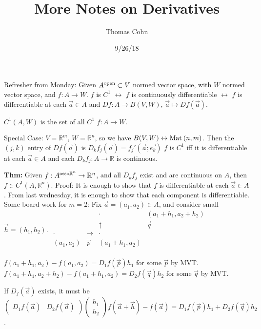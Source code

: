 \documentclass[10pt,letterpaper]{article}
\author{Thomas Cohn}
\title{More Notes on Derivatives}
\date{9/26/18} %
\newcommand{\n}{\hfill\break}
\newcommand{\thm}[1]{\par\noindent\settowidth{\hangindent}{\textbf{Thm: }}\textbf{Thm: }#1\n}
\newcommand{\ptxt}[1]{\textrm{\textnormal{#1}}}
\newcommand{\reals}{\mathbb{R}}
\newcommand{\R}{\reals}
\newcommand{\Mat}{\ptxt{Mat}\>}
\begin{document}
\maketitle
\setlength\RaggedRightParindent{\parindent}
\RaggedRight

\par\noindent Refresher from Monday: Given $A^{\ptxt{open}}\subset{}V$ normed vector space, with $W$ normed vector space, and $f:A\to{}W$.\n
$f$ is $C^{1}$ $\leftrightarrow$ $f$ is continuously differentiable\n
{} $\leftrightarrow$ $f$ is differentiable at each $\vec{a}\in{}A$ and $Df:A\to{}B(V,W)$, $\vec{a}\mapsto{}Df(\vec{a})$.\n

\par\noindent $C^{1}(A,W)$ is the set of all $C^{1}$ $f:A\to{}W$.\n

\par\noindent Special Case: $V=\R^{m}$, $W=\R^{n}$, so we have $B(V,W)\leftrightarrow{}\Mat(n,m)$.\n
Then the $(j,k)$ entry of $Df(\vec{a})$ is $D_{k}f_{j}(\vec{a})=f_{j}'(\vec{a};\vec{e_{k}})$\n
$f$ is $C^{1}$ iff it is differentiable at each $\vec{a}\in{}A$ and each $D_{k}f_{j}:A\to\R$ is continuous.\n

\thm{Given $f:A^{\ptxt{osso}\R^{n}}\to\R^{n}$, and all $D_{k}f_{j}$ exist and are continuous on $A$, then $f\in{}C^{1}(A,\R^{n})$.\n
Proof: It is enough to show that $f$ is differentiable at each $\vec{a}\in{}A$. From last wednesday, it is enough to show that each component is differentiable.\n
\n
Some board work for $m=2$:\n
Fix $\vec{a}=(a_{1},a_{2})\in{}A$, and consider small $\vec{h}=(h_{1},h_{2})$.\n
$\displaystyle\begin{array}{ccrl}
 & & \cdot & (a_{1}+h_{1},a_{2}+h_{2})\\
 & & \uparrow & \vec{q}\\
 \cdot & \rightarrow & \cdot & \\
 (a_{1},a_{2}) & \vec{p} & (a_{1}+h_{1},a_{2}) & \\
\end{array}$}\n

\par\noindent $f(a_{1}+h_{1},a_{2})-f(a_{1},a_{2})=D_{1}f(\vec{p})h_{1}$ for some $\vec{p}$ by MVT.\n
$f(a_{1}+h_{1},a_{2}+h_{2})-f(a_{1}+h_{1},a_{2})=D_{2}f(\vec{q})h_{2}$ for some $\vec{q}$ by MVT.\n

\par\noindent If $D_{f}(\vec{a})$ exists, it must be $\left(\begin{array}{cc}D_{1}f(\vec{a}) & D_{2}f(\vec{a})\end{array}\right)\left(\begin{array}{c}h_{1}\\ h_{2}\end{array}\right)f(\vec{a}+\vec{h})-f(\vec{a})=D_{1}f(\vec{p})h_{1}+D_{2}f(\vec{q})h_{2}$.\n
\end{document}
